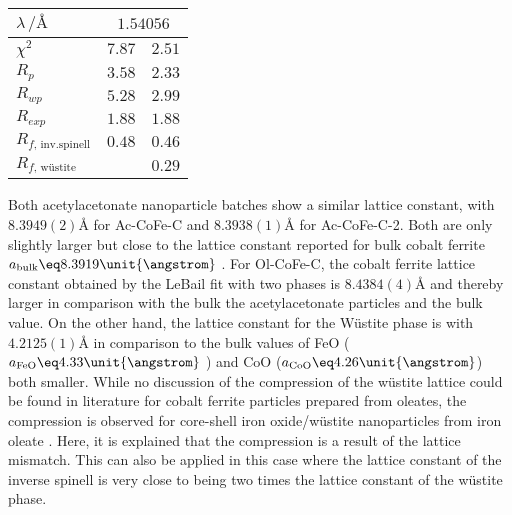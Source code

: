\documentclass[\main/dresen_thesis.tex]{subfiles}
\begin{document}
\begin{table}[ht]
\begin{tabular}{ l | l | l }
      \hline
      \rule{0pt}{2ex} $\lambda \,/ \unit{\angstrom}$  & \multicolumn{2}{c}{$1.54056$}\\
      \hline
      \rule{0pt}{2ex} $\chi^2$                                               & $7.87$      & $2.51$ \\
      \rule{0pt}{2ex} $R_p$                                                  & $3.58$      & $2.33$ \\
      \rule{0pt}{2ex} $R_{wp}$                                               & $5.28$      & $2.99$ \\
      \rule{0pt}{2ex} $R_{exp}$                                              & $1.88$      & $1.88$ \\
      \rule{0pt}{2ex} $R_{f, \, \mathrm{inv. spinell}}$                      & $0.48$      & $0.46$ \\
      \rule{0pt}{2ex} $R_{f, \, \text{w\"ustite}}$                           &             & $0.29$ \\
      \hline
    \end{tabular}
  \end{table}

    Both acetylacetonate nanoparticle batches show a similar lattice constant, with $8.3949(2) \unit{\angstrom}$ for Ac-CoFe-C and $8.3938(1) \unit{\angstrom}$ for Ac-CoFe-C-2.
    Both are only slightly larger but close to the lattice constant reported for bulk cobalt ferrite $a_\mathrm{bulk} \eq 8.3919 \unit{\angstrom}$ \cite{Stein_2018_Struct}.
    For Ol-CoFe-C, the cobalt ferrite lattice constant obtained by the LeBail fit with two phases is $8.4384(4) \unit{\angstrom}$ and thereby larger in comparison with the bulk the acetylacetonate particles and the bulk value.
    On the other hand, the lattice constant for the W\"ustite phase is with $4.2125(1) \unit{\angstrom}$ in comparison to the bulk values of FeO ($a_\mathrm{FeO} \eq 4.33 \unit{\angstrom}$ \cite{Hentschel_1970_Stoich}) and CoO ($a_\mathrm{CoO} \eq 4.26 \unit{\angstrom}$) both smaller.
    While no discussion of the compression of the w\"ustite lattice could be found in literature for cobalt ferrite particles prepared from oleates, the compression is observed for core-shell iron oxide/w\"ustite nanoparticles from iron oleate  \cite{Wetterskog_2013_Anoma}.
    Here, it is explained that the compression is a result of the lattice mismatch.
    This can also be applied in this case where the lattice constant of the inverse spinell is very close to being two times the lattice constant of the w\"ustite phase.
\end{document}
